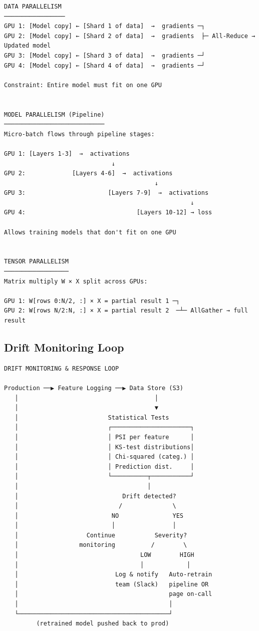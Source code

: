 \documentclass[11pt]{article}
\begin{document}
\setcodelang{}

\begin{verbatim}
DATA PARALLELISM
─────────────────
GPU 1: [Model copy] ← [Shard 1 of data]  →  gradients ─┐
GPU 2: [Model copy] ← [Shard 2 of data]  →  gradients  ├─ All-Reduce → Updated model
GPU 3: [Model copy] ← [Shard 3 of data]  →  gradients ─┘
GPU 4: [Model copy] ← [Shard 4 of data]  →  gradients ─┘

Constraint: Entire model must fit on one GPU


MODEL PARALLELISM (Pipeline)
────────────────────────────
Micro-batch flows through pipeline stages:

GPU 1: [Layers 1-3]  →  activations
                              ↓
GPU 2:             [Layers 4-6]  →  activations
                                          ↓
GPU 3:                       [Layers 7-9]  →  activations
                                                    ↓
GPU 4:                               [Layers 10-12] → loss

Allows training models that don't fit on one GPU


TENSOR PARALLELISM
──────────────────
Matrix multiply W × X split across GPUs:

GPU 1: W[rows 0:N/2, :] × X = partial result 1 ─┐
GPU 2: W[rows N/2:N, :] × X = partial result 2  ─┴─ AllGather → full result
\end{verbatim}

\subsection{Drift Monitoring Loop}\label{drift-monitoring-loop}

\setcodelang{}

\begin{verbatim}
DRIFT MONITORING & RESPONSE LOOP

Production ──▶ Feature Logging ──▶ Data Store (S3)
   │                                      │
   │                                      ▼
   │                         Statistical Tests
   │                         ┌──────────────────────┐
   │                         │ PSI per feature      │
   │                         │ KS-test distributions│
   │                         │ Chi-squared (categ.) │
   │                         │ Prediction dist.     │
   │                         └──────────┬───────────┘
   │                                    │
   │                             Drift detected?
   │                            /              \
   │                          NO               YES
   │                          │                │
   │                   Continue           Severity?
   │                 monitoring          /        \
   │                                  LOW        HIGH
   │                                  │            │
   │                           Log & notify   Auto-retrain
   │                           team (Slack)   pipeline OR
   │                                          page on-call
   │                                          │
   └──────────────────────────────────────────┘
         (retrained model pushed back to prod)
\end{verbatim}
\end{document}
